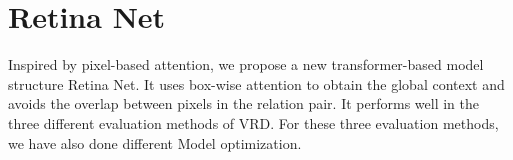 %
%
%



\section{Retina Net}
\label{sec:retinanet}
Inspired by pixel-based attention, we propose a new transformer-based model structure Retina Net. It uses box-wise attention to obtain the global context and avoids the overlap between pixels in the relation pair. It performs well in the three different evaluation methods of VRD. For these three evaluation methods, we have also done different Model optimization.

